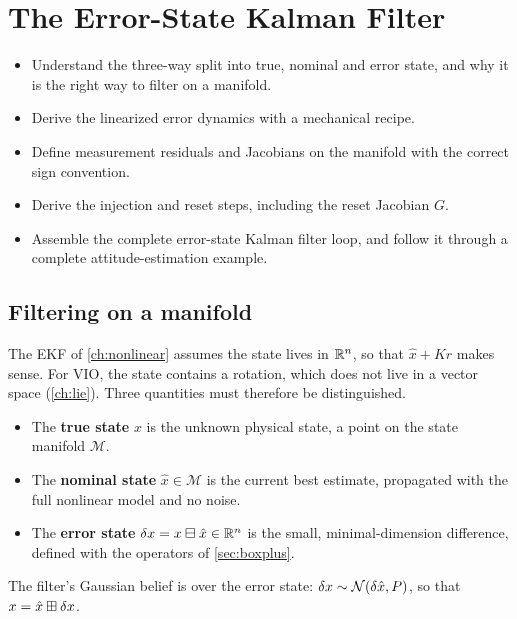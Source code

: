 \chapter{The Error-State Kalman Filter}
\label{ch:eskf}

\begin{objectives}
\begin{itemize}
  \item Understand the three-way split into true, nominal and error state, and why it is the right way to filter on a manifold.
  \item Derive the linearized error dynamics with a mechanical recipe.
  \item Define measurement residuals and Jacobians on the manifold with the correct sign convention.
  \item Derive the injection and reset steps, including the reset Jacobian $G$.
  \item Assemble the complete error-state Kalman filter loop, and follow it through a complete attitude-estimation example.
\end{itemize}
\end{objectives}

\section{Filtering on a manifold}

The EKF of \cref{ch:nonlinear} assumes the state lives in $\mathbb{R}^n$, so that $\hat x + Kr$ makes sense. For VIO, the state contains a rotation, which does
not live in a vector space (\cref{ch:lie}). Three quantities must therefore be distinguished.

\begin{definition}
\begin{itemize}
  \item The \textbf{true state} $x$ is the unknown physical state, a point on the state manifold $\mathcal{M}$.
  \item The \textbf{nominal state} $\hat x \in \mathcal{M}$ is the current best estimate, propagated with the full nonlinear model and no noise.
  \item The \textbf{error state} $\delta x = x \boxminus \hat x \in \mathbb{R}^{n}$ is the small, minimal-dimension difference, defined with the operators of
        \cref{sec:boxplus}.
\end{itemize}
The filter's Gaussian belief is over the error state: $\delta x \sim \mathcal{N}(\delta\hat x, P)$, so that $x = \hat x \boxplus \delta x$.
\end{definition}

